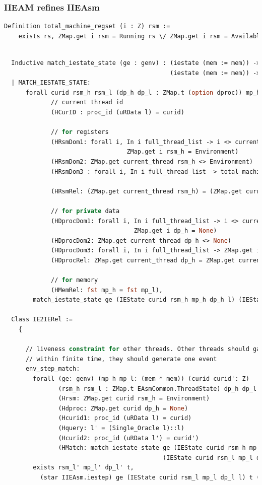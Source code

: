 \subsubsection{IIEAM refines IIEAsm}

\begin{lstlisting}[language=Caml]
  Definition total_machine_regset (i : Z) rsm :=
    exists rs, ZMap.get i rsm = Running rs \/ ZMap.get i rsm = Available.  
\end{lstlisting}


\begin{lstlisting}[language=Caml]

  Inductive match_iestate_state (ge : genv) : (iestate (mem := mem)) -> 
                                              (iestate (mem := mem)) -> Prop :=  
  | MATCH_IESTATE_STATE:
      forall curid rsm_h rsm_l (dp_h dp_l : ZMap.t (option dproc)) mp_h mp_l l
             // current thread id
             (HCurID : proc_id (uRData l) = curid)

             // for registers 
             (HRsmDom1: forall i, In i full_thread_list -> i <> current_thread ->
                                  ZMap.get i rsm_h = Environment)
             (HRsmDom2: ZMap.get current_thread rsm_h <> Environment)
             (HRsmDom3 : forall i, In i full_thread_list -> total_machine_regset i rsm_l)
             
             (HRsmRel: (ZMap.get current_thread rsm_h) = (ZMap.get current_thread rsm_l))
             
             // for private data 
             (HDprocDom1: forall i, In i full_thread_list -> i <> current_thread ->
                                    ZMap.get i dp_h = None)
             (HDprocDom2: ZMap.get current_thread dp_h <> None)
             (HDprocDom3: forall i, In i full_thread_list -> ZMap.get i dp_l <> None)
             (HDprocRel: ZMap.get current_thread dp_h = ZMap.get current_thread dp_l)

             // for memory 
             (HMemRel: fst mp_h = fst mp_l),
        match_iestate_state ge (IEState curid rsm_h mp_h dp_h l) (IEState curid rsm_l mp_l dp_l l).

  Class IE2IERel :=
    {

      // liveness constraint for other threads. Other threads should gaurantee this property -
      // within finite time, they should generate one event 
      env_step_match:
        forall (ge: genv) (mp_h mp_l: (mem * mem)) (curid curid': Z)
               (rsm_h rsm_l : ZMap.t EAsmCommon.ThreadState) dp_h dp_l (l l' : Log)
               (Hrsm: ZMap.get curid rsm_h = Environment)
               (Hdproc: ZMap.get curid dp_h = None)
               (Hcurid1: proc_id (uRData l) = curid)
               (Hquery: l' = (Single_Oracle l)::l)
               (Hcurid2: proc_id (uRData l') = curid')
               (HMatch: match_iestate_state ge (IEState curid rsm_h mp_h dp_h l) 
                                            (IEState curid rsm_l mp_l dp_l l)),
        exists rsm_l' mp_l' dp_l' t,
          (star IIEAsm.iestep) ge (IEState curid rsm_l mp_l dp_l l) t (IEState curid' rsm_l' mp_l' dp_l' l');



\end{lstlisting}
